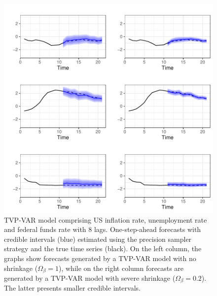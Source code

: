 \documentclass[
  12pt,
]{book}
\theoremstyle{break}
\theoremstyle{nonumberplain}
\begin{document}
\begin{figure}[H]

{\centering \includegraphics{Dynamic-Shrinkage-in-Bayesian-Structural-Time-Series-and-Vector-Autoregressive-Models_files/figure-latex/myfig71-1} 

}

\caption{TVP-VAR model comprising US inflation rate, unemployment rate and federal funds rate with 8 lags. One-step-ahead forecasts with credible intervals (blue) estimated using the precision sampler strategy and the true time series (black). On the left column, the graphs show forecasts generated by a TVP-VAR model with no shrinkage ($\Omega_\beta=1$), while on the right column forecasts are generated by a TVP-VAR model with severe shrinkage ($\Omega_\beta=0.2$). The latter presents smaller credible intervals.}\label{fig:myfig71}
\end{figure}
\end{document}

